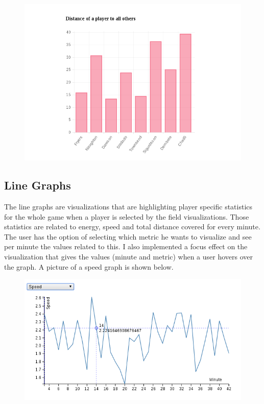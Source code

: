 \documentclass{article}
\begin{document}
\begin{figure}[ht!]
\centering
\includegraphics[scale=0.35]{bar}
\end{figure}

\subsection{Line Graphs}
The line graphs are visualizations that are highlighting player specific statistics for the whole game when a player is selected by the field visualizations. Those statistics are related to energy, speed and total distance covered for every minute. The user has the option of selecting which metric he wants to visualize and see per minute the values related to this. I also implemented a focus effect on the visualization that gives the values (minute and metric) when a user hovers over the graph. A picture of a speed graph is shown below.

\begin{figure}[ht!]
\centering
\includegraphics[scale=0.35]{line}
\end{figure}
 



\end{document}
